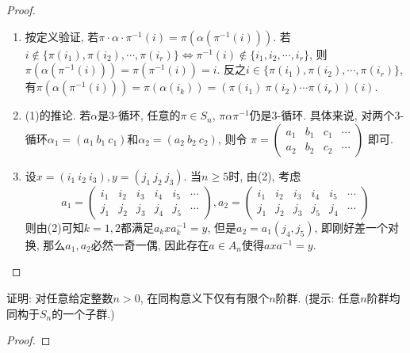 \begin{proof}
    \begin{enumerate}[(1)]
        \item 按定义验证, 若$\pi \cdot \alpha \cdot \pi^{-1}(i) = \pi(\alpha(\pi^{-1}(i)))$. 若$i \notin \{\pi(i_1), \pi(i_2), \cdots, \pi(i_r)\} \iff \pi^{-1}(i) \notin \{i_1, i_2, \cdots, i_r\}$, 则$\pi(\alpha(\pi^{-1}(i))) = \pi(\pi^{-1}(i)) = i$. 反之$i \in \{\pi(i_1), \pi(i_2), \cdots, \pi(i_r)\}$, 有$\pi(\alpha(\pi^{-1}(i))) = \pi(\alpha(i_k)) = (\pi(i_1)\:\pi(i_2) \cdots \pi(i_r))(i)$.
        \item (1)的推论. 若$\alpha$是$3$-循环, 任意的$\pi \in S_n$, $\pi\alpha\pi^{-1}$仍是$3$-循环. 具体来说, 对两个$3$-循环$\alpha_1 = (a_1\:b_1\:c_1)$和$\alpha_2 = (a_2\:b_2\:c_2)$, 则令
        \(
            \pi = 
            \begin{pmatrix} 
                a_1 & b_1 & c_1 & \cdots \\
                a_2 & b_2 & c_2 & \cdots 
            \end{pmatrix}
        \) 
        即可.
        \item 设$x = (i_1\:i_2\:i_3), y = (j_1\:j_2\:j_3)$. 当$n \geqslant 5$时, 由(2), 考虑
        \[
            a_1 =
            \begin{pmatrix} 
                i_1 & i_2 & i_3 & i_4 & i_5 & \cdots \\
                j_1 & j_2 & j_3 & j_4 & j_5 & \cdots 
            \end{pmatrix},
            a_2 =
            \begin{pmatrix} 
                i_1 & i_2 & i_3 & i_4 & i_5 & \cdots \\
                j_1 & j_2 & j_3 & j_5 & j_4 & \cdots 
            \end{pmatrix}
        \]
        则由(2)可知$k = 1, 2$都满足$a_kxa_k^{-1} = y$, 但是$a_2 = a_1(j_4, j_5)$, 即刚好差一个对换, 那么$a_1, a_2$必然一奇一偶, 因此存在$a \in A_n$使得$axa^{-1} = y$.
    \end{enumerate}
\end{proof}

\begin{problem}
    证明: 对任意给定整数$n > 0$, 在同构意义下仅有有限个$n$阶群. (提示: 任意$n$阶群均同构于$S_n$的一个子群.)
\end{problem}

\begin{proof}
    
\end{proof}

